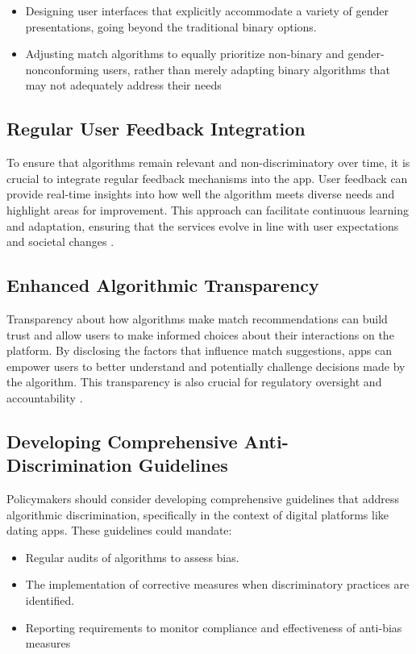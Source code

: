 \begin{itemize}
    \item Designing user interfaces that explicitly accommodate a variety of gender presentations, going beyond the traditional binary options.
    \item Adjusting match algorithms to equally prioritize non-binary and gender-nonconforming users, rather than merely adapting binary algorithms that may not adequately address their needs \cite{Kalra_Gupta_Varghese_Rangaswamy_2023}
\end{itemize}

\subsection{Regular User Feedback Integration}
To ensure that algorithms remain relevant and non-discriminatory over time, it is crucial to integrate regular feedback mechanisms into the app. User feedback can provide real-time insights into how well the algorithm meets diverse needs and highlight areas for improvement. This approach can facilitate continuous learning and adaptation, ensuring that the services evolve in line with user expectations and societal changes \cite{Kalra_Gupta_Varghese_Rangaswamy_2023}.

\subsection{Enhanced Algorithmic Transparency}
Transparency about how algorithms make match recommendations can build trust and allow users to make informed choices about their interactions on the platform. By disclosing the factors that influence match suggestions, apps can empower users to better understand and potentially challenge decisions made by the algorithm. This transparency is also crucial for regulatory oversight and accountability \cite{PASQUALE_2015}.

\subsection{Developing Comprehensive Anti-Discrimination Guidelines}
Policymakers should consider developing comprehensive guidelines that address algorithmic discrimination, specifically in the context of digital platforms like dating apps. These guidelines could mandate:

\begin{itemize}
    \item Regular audits of algorithms to assess bias.
    \item The implementation of corrective measures when discriminatory practices are identified.
    \item Reporting requirements to monitor compliance and effectiveness of anti-bias measures \cite{Eubanks_2018}
\end{itemize}

